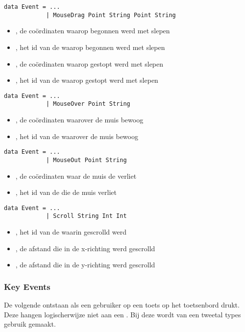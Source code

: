 \begin{lstlisting}
data Event = ...
			| MouseDrag Point String Point String
\end{lstlisting}
\begin{itemize}
	\item {}, de coördinaten waarop begonnen werd met slepen
	\item {}, het id van de \shape waarop begonnen werd met slepen
	\item {}, de coördinaten waarop gestopt werd met slepen
	\item {}, het id van de \shape waarop gestopt werd met slepen 
\end{itemize}

\begin{lstlisting}
data Event = ...
			| MouseOver Point String
\end{lstlisting}
\begin{itemize}
	\item {}, de coördinaten waarover de muis bewoog
	\item {}, het id van de \shape waarover de muis bewoog
\end{itemize}

\begin{lstlisting}
data Event = ...
			| MouseOut Point String
\end{lstlisting}
\begin{itemize}
	\item {}, de coördinaten waar de muis de \shape verliet
	\item {}, het id van de \shape die de muis verliet
\end{itemize}

\begin{lstlisting}
data Event = ...
			| Scroll String Int Int
\end{lstlisting}
\begin{itemize}
	\item {}, het id van de \shape waarin gescrolld werd
	\item {}, de afstand die in de x-richting werd gescrolld
	\item {}, de afstand die in de y-richting werd gescrolld
\end{itemize}

\subsubsection{Key Events}
De volgende \events ontstaan als een gebruiker op een toets op het toetsenbord drukt. Deze hangen logischerwijze niet aan een \shape. 
Bij deze \events wordt van een tweetal types gebruik gemaakt. 

